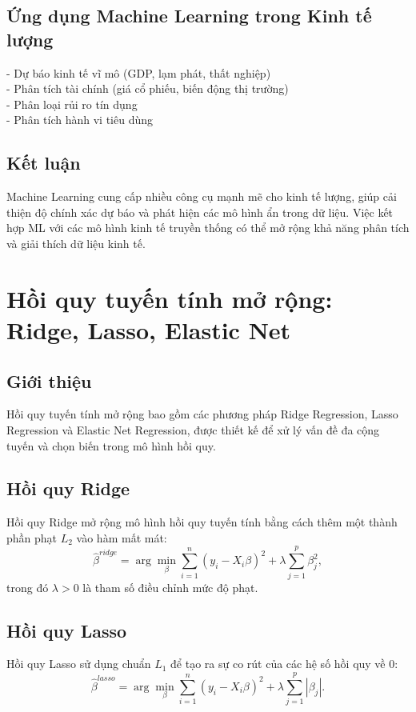 \subsection{Ứng dụng Machine Learning trong Kinh tế lượng}
- Dự báo kinh tế vĩ mô (GDP, lạm phát, thất nghiệp)\\
- Phân tích tài chính (giá cổ phiếu, biến động thị trường)\\
- Phân loại rủi ro tín dụng\\
- Phân tích hành vi tiêu dùng

\subsection{Kết luận}
Machine Learning cung cấp nhiều công cụ mạnh mẽ cho kinh tế lượng, giúp cải thiện độ chính xác dự báo và phát hiện các mô hình ẩn trong dữ liệu. Việc kết hợp ML với các mô hình kinh tế truyền thống có thể mở rộng khả năng phân tích và giải thích dữ liệu kinh tế.



\section{Hồi quy tuyến tính mở rộng: Ridge, Lasso, Elastic Net}
\subsection{Giới thiệu}
Hồi quy tuyến tính mở rộng bao gồm các phương pháp Ridge Regression, Lasso Regression và Elastic Net Regression, được thiết kế để xử lý vấn đề đa cộng tuyến và chọn biến trong mô hình hồi quy.

\subsection{Hồi quy Ridge}
Hồi quy Ridge mở rộng mô hình hồi quy tuyến tính bằng cách thêm một thành phần phạt $L_2$ vào hàm mất mát:
\begin{equation}
    \hat{\beta}^{ridge} = \arg\min_\beta \sum_{i=1}^{n} (y_i - X_i \beta)^2 + \lambda \sum_{j=1}^{p} \beta_j^2,
\end{equation}
trong đó $\lambda > 0$ là tham số điều chỉnh mức độ phạt.

\subsection{Hồi quy Lasso}
Hồi quy Lasso sử dụng chuẩn $L_1$ để tạo ra sự co rút của các hệ số hồi quy về 0:
\begin{equation}
    \hat{\beta}^{lasso} = \arg\min_\beta \sum_{i=1}^{n} (y_i - X_i \beta)^2 + \lambda \sum_{j=1}^{p} |\beta_j|.
\end{equation}

